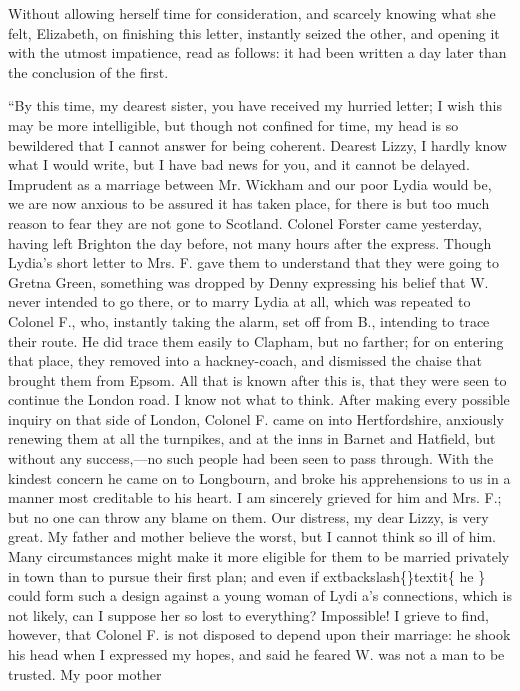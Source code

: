 \documentclass[10pt]{book}
\begin{document}
   Without allowing herself time for consideration, and scarcely knowing
what she felt, Elizabeth, on finishing this letter, instantly seized the
other, and opening it with the utmost impatience, read as follows: it
had been written a day later than the conclusion of the first.
  

   “By this time, my dearest sister, you have received my hurried letter; I
wish this may be more intelligible, but though not confined for time, my
head is so bewildered that I cannot answer for being coherent. Dearest
Lizzy,
   I hardly know what I would write, but I have bad news for you,
and it cannot be delayed. Imprudent as a marriage between Mr. Wickham
and our poor Lydia would be, we are now anxious to be assured it has
taken place, for there is but too much reason to fear they are not gone
to Scotland. Colonel Forster came yesterday, having left Brighton the
day before, not many hours after the express. Though Lydia’s short
letter to Mrs. F. gave them to understand that they were going to Gretna
Green, something was dropped by Denny expressing his belief that W.
never intended to go there, or to marry Lydia at all, which was repeated
to Colonel F., who, instantly taking the alarm, set off from B.,
intending to trace their route. He did trace them easily to Clapham, but
no farther; for on entering that place, they removed into a
hackney-coach, and dismissed the chaise that brought them from Epsom.
All that is known after this is, that they were seen to continue the
London road. I know not what to think. After making every possible
inquiry on that side of London, Colonel F. came on into Hertfordshire,
anxiously renewing them at all the turnpikes, and at the inns in Barnet
and Hatfield, but without any success,—no such people had been seen to
pass through. With the kindest concern he came on to Longbourn, and
broke his apprehensions to us in a manner most creditable to his heart.
I am sincerely grieved for him and Mrs. F.; but no one can throw any
blame on them. Our distress, my dear Lizzy, is very great. My father and
mother believe the worst, but I cannot think so ill of him. Many
circumstances might make it more eligible for them to be married
privately in town than to pursue their first plan; and even if
   	extbackslash\{\}textit\{
    he
   \}
   could form such a design against a young woman of Lydi
   a’s connections,
which is not likely, can I suppose her so lost to everything?
Impossible! I grieve to find, however, that Colonel F. is not disposed
to depend upon their marriage: he shook his head when I expressed my
hopes, and said he feared W. was not a man to be trusted. My poor mother
\end{document}
